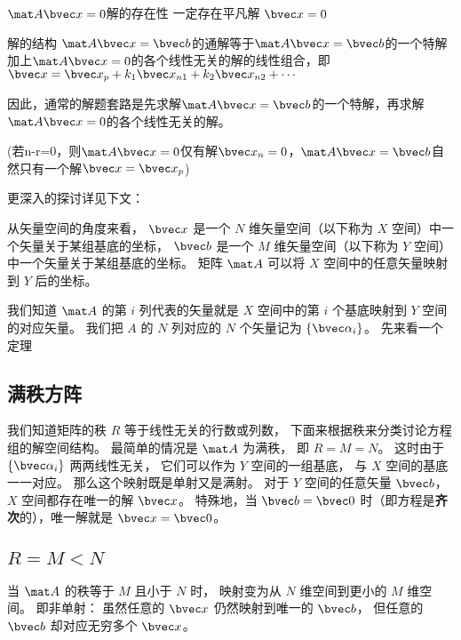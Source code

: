 \begin{theorem}{$\mat A \bvec x=0$解的存在性}
一定存在平凡解 $\bvec x=0$
\end{theorem}

\begin{theorem}{解的结构}
$\mat A \bvec x=\bvec b$的通解等于$\mat A \bvec x=\bvec b$的一个特解加上$\mat A \bvec x=0$的各个线性无关的解的线性组合，即$\bvec x = \bvec x_p +k_1\bvec x_{n1}+k_2\bvec x_{n2}+\cdots$

因此，通常的解题套路是先求解$\mat A \bvec x=\bvec b$的一个特解，再求解$\mat A \bvec x=0$的各个线性无关的解。

(若n-r=0，则$\mat A \bvec x=0$仅有解$\bvec x_n=0$，$\mat A \bvec x=\bvec b$自然只有一个解$\bvec x = \bvec x_p$)
\end{theorem}

更深入的探讨详见下文：

从矢量空间的角度来看， $\bvec x$ 是一个 $N$ 维矢量空间（以下称为 $X$ 空间）中一个矢量关于某组基底的坐标， $\bvec b$ 是一个 $M$ 维矢量空间（以下称为 $Y$ 空间）中一个矢量关于某组基底的坐标。 矩阵 $\mat A$ 可以将 $X$ 空间中的任意矢量映射到 $Y$ 后的坐标。

我们知道 $\mat A$ 的第 $i$ 列代表的矢量就是 $X$ 空间中的第 $i$ 个基底映射到 $Y$ 空间的对应矢量。 我们把 $A$ 的 $N$ 列对应的 $N$ 个矢量记为 $\{\bvec \alpha_i\}$。 先来看一个定理

\subsection{满秩方阵}
我们知道矩阵的秩 $R$ 等于线性无关的行数或列数， 下面来根据秩来分类讨论方程组的解空间结构。 最简单的情况是 $\mat A$ 为满秩， 即 $R = M = N$。 这时由于 $\{\bvec \alpha_i\}$ 两两线性无关， 它们可以作为 $Y$ 空间的一组基底， 与 $X$ 空间的基底一一对应。 那么这个映射既是单射又是满射。%
对于 $Y$ 空间的任意矢量 $\bvec b$， $X$ 空间都存在唯一的解 $\bvec x$。 特殊地，当 $\bvec b = \bvec 0$ 时（即方程是\textbf{齐次}的），唯一解就是 $\bvec x = \bvec 0$。

\subsection{$R = M < N$}\label{sub_LinEq_1}

当 $\mat A$ 的秩等于 $M$ 且小于 $N$ 时， 映射变为从 $N$ 维空间到更小的 $M$ 维空间。 即非单射： 虽然任意的 $\bvec x$ 仍然映射到唯一的 $\bvec b$， 但任意的 $\bvec b$ 却对应无穷多个 $\bvec x$。 

